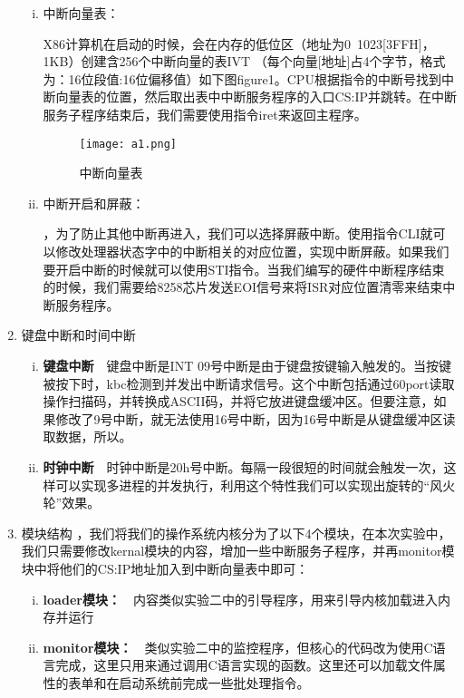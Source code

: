\documentclass[UTF8]{article}
\begin{document}
\begin{enumerate}[1)]
\begin{enumerate}[i)]
			\item 中断向量表：\par X86计算机在启动的时候，会在内存的低位区（地址为0~1023[3FFH]，1KB）创建含256个中断向量的表IVT （每个向量[地址]占4个字节，格式为：16位段值:16位偏移值）如下图figure1。CPU根据指令的中断号找到中断向量表的位置，然后取出表中中断服务程序的入口CS:IP并跳转。在中断服务子程序结束后，我们需要使用指令iret来返回主程序。
			\begin{figure}[htbp]
				\centering
				\texttt{[image: a1.png]}
				\caption{中断向量表}
			\end{figure}
			\newpage
			\item 中断开启和屏蔽：\par{}，为了防止其他中断再进入，我们可以选择屏蔽中断。使用指令CLI就可以修改处理器状态字中的中断相关的对应位置，实现中断屏蔽。如果我们要开启中断的时候就可以使用STI指令。当我们编写的硬件中断程序结束的时候，我们需要给8258芯片发送EOI信号来将ISR对应位置清零来结束中断服务程序。
		\end{enumerate}
	\item 键盘中断和时间中断
		\begin{enumerate}[i)]
		\setlength{\itemsep}{0.2ex}
		\vspace{-0.2cm}
			\item {\bfseries{键盘中断}}\ \ 键盘中断是INT 09号中断是由于键盘按键输入触发的。当按键被按下时，kbc检测到并发出中断请求信号。这个中断包括通过60port读取操作扫描码，并转换成ASCII码，并将它放进键盘缓冲区。但要注意，如果修改了9号中断，就无法使用16号中断，因为16号中断是从键盘缓冲区读取数据，所以{\color{red}{用户程序需要由原来的按键退出改成延时退出}}。
			\item {\bfseries{时钟中断}}\ \ 时钟中断是20h号中断。每隔一段很短的时间就会触发一次，这样可以实现多进程的并发执行，利用这个特性我们可以实现出旋转的“风火轮”效果。
		\end{enumerate}
	\item 模块结构
	，我们将我们的操作系统内核分为了以下4个模块，在本次实验中，我们只需要修改kernal模块的内容，增加一些中断服务子程序，并再monitor模块中将他们的CS:IP地址加入到中断向量表中即可：
		\begin {enumerate}[i)]
		\setlength{\itemsep}{0.2ex}
		\vspace{-0.2cm}
			\item {\bfseries{loader模块：}}\ \ 内容类似实验二中的引导程序，用来引导内核加载进入内存并运行
			\item {\bfseries{monitor模块：}}\ \ 类似实验二中的监控程序，但核心的代码改为使用C语言完成，这里只用来通过调用C语言实现的函数。这里还可以加载文件属性的表单和在启动系统前完成一些批处理指令。{\color{red}{新增：重新填写中断向量表09、20h、33、34、35、36的中断服务程序入口地址}}

\end{enumerate}
\end{enumerate}
\end{document}
